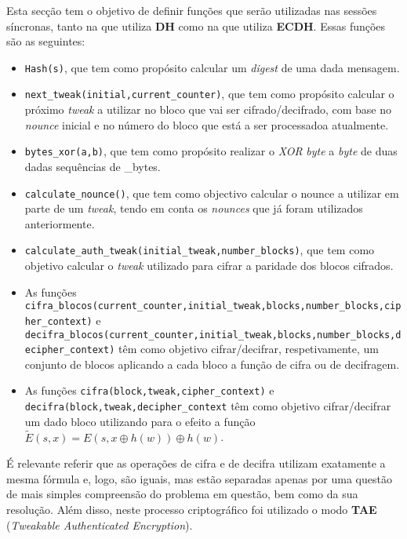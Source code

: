 \documentclass[11pt]{article}
\begin{document}
    Esta secção tem o objetivo de definir funções que serão utilizadas nas
sessões síncronas, tanto na que utiliza \textbf{DH} como na que utiliza
\textbf{ECDH}. Essas funções são as seguintes:

\begin{itemize}
\item
  \texttt{Hash(s)}, que tem como propósito calcular um \emph{digest} de
  uma dada mensagem.
\item
  \texttt{next\_tweak(initial,current\_counter)}, que tem como propósito
  calcular o próximo \emph{tweak} a utilizar no bloco que vai ser
  cifrado/decifrado, com base no \emph{nounce} inicial e no número do
  bloco que está a ser processadoa atualmente.
\item
  \texttt{bytes\_xor(a,b)}, que tem como propósito realizar o \emph{XOR}
  \emph{byte} a \emph{byte} de duas dadas sequências de \_bytes.
\item
  \texttt{calculate\_nounce()}, que tem como objectivo calcular o nounce
  a utilizar em parte de um \emph{tweak}, tendo em conta os
  \emph{nounces} que já foram utilizados anteriormente.
\item
  \texttt{calculate\_auth\_tweak(initial\_tweak,number\_blocks)}, que
  tem como objetivo calcular o \emph{tweak} utilizado para cifrar a
  paridade dos blocos cifrados.
\item
  As funções
  \texttt{cifra\_blocos(current\_counter,initial\_tweak,blocks,number\_blocks,cipher\_context)}
  e
  \texttt{decifra\_blocos(current\_counter,initial\_tweak,blocks,number\_blocks,decipher\_context)}
  têm como objetivo cifrar/decifrar, respetivamente, um conjunto de
  blocos aplicando a cada bloco a função de cifra ou de decifragem.
\item
  As funções \texttt{cifra(block,tweak,cipher\_context)} e
  \texttt{decifra(block,tweak,decipher\_context} têm como objetivo
  cifrar/decifrar um dado bloco utilizando para o efeito a função
  $\tilde{E}(s,x) = E(s,x \oplus h(w)) \oplus h(w)$.
\end{itemize}

É relevante referir que as operações de cifra e de decifra utilizam
exatamente a mesma fórmula e, logo, são iguais, mas estão separadas
apenas por uma questão de mais simples compreensão do problema em
questão, bem como da sua resolução. Além disso, neste processo
criptográfico foi utilizado o modo \textbf{TAE} (\emph{Tweakable
Authenticated Encryption}).
\end{document}
